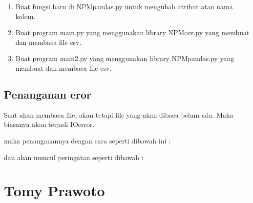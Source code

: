 \begin{enumerate}
	
	
	\item Buat fungsi baru di NPMpandas.py untuk mengubah atribut atau nama kolom.
	
	
	
	\item Buat program main.py yang menggunakan library NPMcsv.py yang membuat dan membaca file csv.
	
	
	
	\item Buat program main2.py yang menggunakan library NPMpandas.py yang membuat dan membaca file csv.
	
		
\end{enumerate}

\subsection{Penanganan eror}
Saat akan membaca file, akan tetapi file yang akan dibaca belum ada. Maka biasanya akan terjadi IOerror.

maka penanganannya dengan cara seperti dibawah ini :

dan akan muncul peringatan seperti dibawah :



\section{Tomy Prawoto}
